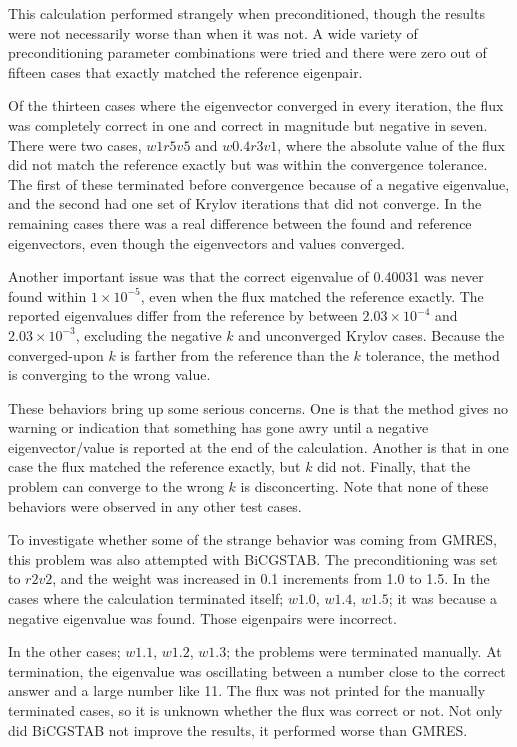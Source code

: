 This calculation performed strangely when preconditioned, though the results were not necessarily worse than when it was not. A wide variety of preconditioning parameter combinations were tried and there were zero out of fifteen cases that exactly matched the reference eigenpair. 

Of the thirteen cases where the eigenvector converged in every iteration, the flux was completely correct in one and correct in magnitude but negative in seven. There were two cases, $w1r5v5$ and $w0.4r3v1$, where the absolute value of the flux did not match the reference exactly but was within the convergence tolerance. The first of these terminated before convergence because of a negative eigenvalue, and the second had one set of Krylov iterations that did not converge. In the remaining cases there was a real difference between the found and reference eigenvectors, even though the eigenvectors and values converged. 

Another important issue was that the correct eigenvalue of 0.40031 was never found within $1 \times 10^{-5}$, even when the flux matched the reference exactly. The reported eigenvalues differ from the reference by between $2.03 \times 10^{-4}$ and $2.03 \times 10^{-3}$, excluding the negative $k$ and unconverged Krylov cases. Because the converged-upon $k$ is farther from the reference than the $k$ tolerance, the method is converging to the wrong value. 

These behaviors bring up some serious concerns. One is that the method gives no warning or indication that something has gone awry until a negative eigenvector/value is reported at the end of the calculation. Another is that in one case the flux matched the reference exactly, but $k$ did not. Finally, that the problem can converge to the wrong $k$ is disconcerting. Note that none of these behaviors were observed in any other test cases.  

To investigate whether some of the strange behavior was coming from GMRES, this problem was also attempted with BiCGSTAB. The preconditioning was set to $r2v2$, and the weight was increased in 0.1 increments from 1.0 to 1.5. In the cases where the calculation terminated itself; $w1.0$, $w1.4$, $w1.5$; it was because a negative eigenvalue was found. Those eigenpairs were incorrect. 

In the other cases; $w1.1$, $w1.2$, $w1.3$; the problems were terminated manually. At termination, the eigenvalue was oscillating between a number close to the correct answer and a large number like 11. The flux was not printed for the manually terminated cases, so it is unknown whether the flux was correct or not. Not only did BiCGSTAB not improve the results, it performed worse than GMRES.

